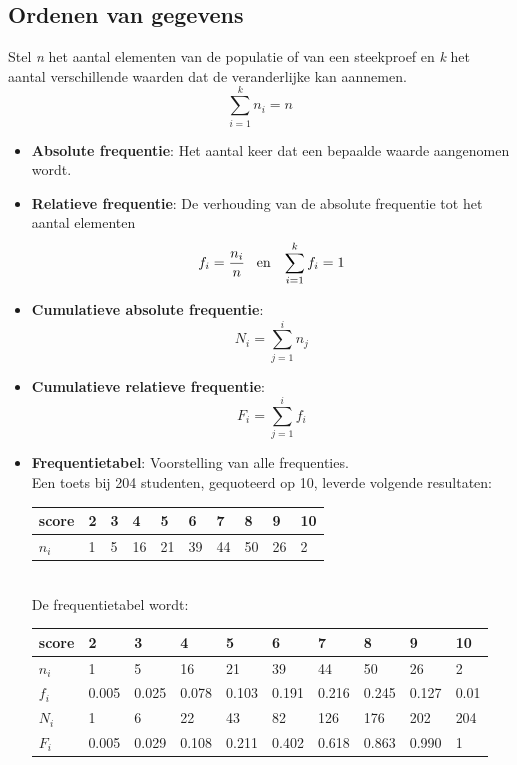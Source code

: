 \documentclass[12pt]{report}
\begin{document}
\subsection{Ordenen van gegevens}
Stel \textit{n} het aantal elementen van de populatie of van een steekproef en \textit{k} het aantal verschillende waarden dat de veranderlijke kan aannemen.
$$\sum_{i=1}^{k} n_i = n$$
\begin{itemize}
	\item {\textbf{Absolute frequentie}: Het aantal keer dat een bepaalde waarde aangenomen wordt.
			
	}
	\item {\textbf{Relatieve frequentie}: De verhouding van de absolute frequentie tot het aantal elementen
		$$f_i = \frac{n_i}{n}\;\;\;\hbox{en}\;\;\;\sum_{i = 1}^{k} f_i = 1$$
	}
	\item {\textbf{Cumulatieve absolute frequentie}: 
		$$N_i = \sum_{j=1}^{i} n_j$$
	}
	\item {\textbf{Cumulatieve relatieve frequentie}:
		$$F_i = \sum_{j=1}^{i} f_i$$
	}
	\item {\textbf{Frequentietabel}: Voorstelling van alle frequenties.\\
		Een toets bij 204 studenten, gequoteerd op 10, leverde volgende resultaten:\\
		\begin{tabular}{l | l l l l l l l l l}
			score & 2 & 3 & 4  & 5  & 6  & 7  & 8  & 9  & 10 \\
			\hline
			$n_i$ & 1 & 5 & 16 & 21 & 39 & 44 & 50 & 26 & 2  
		\end{tabular}\\
		De frequentietabel wordt:\\
		\begin{tabular}{l | l | l | l | l | l | l | l | l | l}
			score & 2     & 3     & 4     & 5     & 6     & 7     & 8     & 9     & 10   \\
			\hline
			$n_i$ & 1     & 5     & 16    & 21    & 39    & 44    & 50    & 26    & 2    \\
			$f_i$ & 0.005 & 0.025 & 0.078 & 0.103 & 0.191 & 0.216 & 0.245 & 0.127 & 0.01 \\
			$N_i$ & 1     & 6     & 22    & 43    & 82    & 126   & 176   & 202   & 204  \\
			$F_i$ & 0.005 & 0.029 & 0.108 & 0.211 & 0.402 & 0.618 & 0.863 & 0.990 & 1    
		\end{tabular}
	}
\end{itemize}
\end{document}
